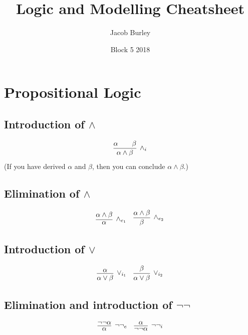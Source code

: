 \documentclass{article}
\title{Logic and Modelling Cheatsheet}
\author{Jacob Burley}
\date{Block 5 2018}
\newcommand{\rulename}[1]{#1}
\begin{document}
\maketitle

\section*{Propositional Logic}

\subsection*{Introduction of $\wedge$}
    \begin{align*}
      \infer[\rulename{\wedge_i}]
      {\alpha \wedge \beta}
      {\alpha && \beta}
    \end{align*}
    (If you have derived $\alpha$ and $\beta$, then you can conclude $\alpha \wedge \beta$.)
\subsection*{Elimination of $\wedge$}
    \begin{align*}
      \infer[\rulename{\wedge_{e_1}}]
      {\alpha}
      {\alpha \wedge \beta}
      &&
      \infer[\rulename{\wedge_{e_2}}]
      {\beta}
      {\alpha \wedge \beta}
    \end{align*}

\subsection*{Introduction of $\vee$}
    \begin{align*}
      \infer[\rulename{\vee_{i_1}}]
      {\alpha \vee \beta}
      {\alpha}&&
      \infer[\rulename{\vee_{i_2}}]
      {\alpha \vee \beta}
      {\beta}
    \end{align*}
    
\subsection*{Elimination and introduction of $\neg\neg$}
    \begin{align*}
      \infer[\rulename{\neg\neg_e}]
      {\alpha}
      {\neg\neg\alpha}
      &&
      \infer[\rulename{\neg\neg_i}]
      {\neg\neg\alpha}
      {\alpha}
    \end{align*}
    
\end{document}
